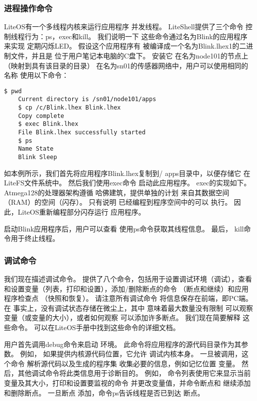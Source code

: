 \subsubsection{进程操作命令}
LiteOS有一个多线程内核来运行应用程序
并发线程。 LiteShell提供了三个命令
控制线程行为：ps，exec和kill。 我们说明一下
这些命令通过名为Blink的应用程序来实现
定期闪烁LED。 假设这个应用程序有
被编译成一个名为Blink.lhex1的二进制文件，并且是
位于用户笔记本电脑的C盘下。 安装它
在名为node101的节点上（映射到具有该目录的目录）
在名为sn01的传感器网络中，用户可以使用相同的名称
使用以下命令：
\begin{lstlisting}[language={[ANSI]C},keywordstyle=\color{blue!70},commentstyle=\color{red!50!green!50!blue!50},frame=shadowbox, rulesepcolor=\color{red!20!green!20!blue!20}]
    $ pwd
    Current directory is /sn01/node101/apps
    $ cp /c/Blink.lhex Blink.lhex
    Copy complete
    $ exec Blink.lhex
    File Blink.lhex successfully started
    $ ps
    Name State
    Blink Sleep
    \end{lstlisting}
如本例所示，我们首先将应用程序Blink.lhex复制到/ apps目录中，以便存储它
在LiteFS文件系统中。 然后我们使用exec命令
启动此应用程序。 exec的实现如下。 Atmega128的处理器架构遵循
哈佛建筑，提供单独的计划
来自其数据空间（RAM）的空间（闪存）。 只有说明
已经编程到程序空间中的可以
执行。 因此，LiteOS重新编程部分闪存运行
应用程序。

启动Blink应用程序后，用户可以查看
使用ps命令获取其线程信息。 最后，
kill命令用于终止线程。

\subsubsection{调试命令}
我们现在描述调试命令。 提供了八个命令，包括用于设置调试环境（调试），查看和设置变量（列表，打印和设置），添加/删除断点的命令
（断点和继续）和应用程序检查点
（快照和恢复）。 请注意所有调试命令
将信息保存在前端，即PC端。 在
事实上，没有调试状态存储在微尘上，其中
意味着最大数量没有限制
可以观察变量（或变量的大小），或者如何观察
可以添加许多断点。 我们现在简要解释
这些命令。 可以在LiteOS手册中找到这些命令的详细文档。

用户首先调用debug命令来启动
环境。 此命令将应用程序的源代码目录作为其参数。 例如，
如果提供内核源代码位置，它允许
调试内核本身。 一旦被调用，这个命令
解析源代码以及生成的程序集
收集必要的信息，例如记忆位置
变量。 然后，其他调试命令将此类信息用于诊断目的。 例如，
命令列表使用它来显示当前变量及其大小，打印和设置要监视的命令
并更改变量值，并命令断点和
继续添加和删除断点。 一旦断点
添加，命令ps告诉线程是否已到达
断点。


